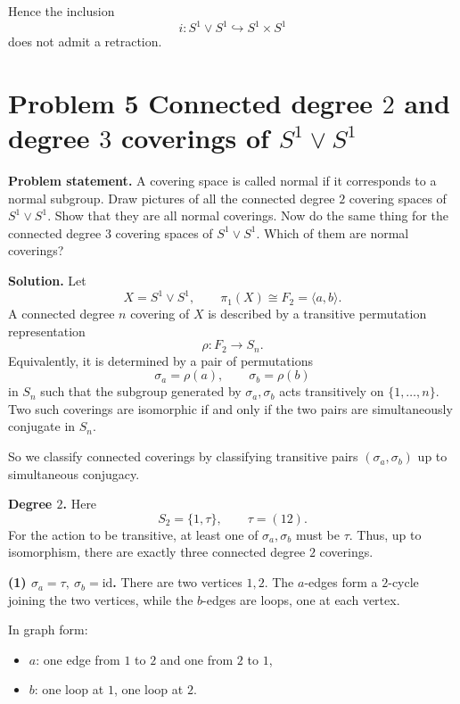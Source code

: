 \documentclass[12pt,a4paper]{article}
\theoremstyle{notespace}
\begin{document}
Hence the inclusion
\[
i:S^1\vee S^1\hookrightarrow S^1\times S^1
\]
does not admit a retraction.

\bigskip

\section{Problem 5 Connected degree \texorpdfstring{$2$}{2} and degree \texorpdfstring{$3$}{3} coverings of \texorpdfstring{$S^1\vee S^1$}{S1 vee S1}}

\textbf{Problem statement.}
A covering space is called normal if it corresponds to a normal subgroup. Draw pictures of all the connected degree \(2\) covering spaces of \(S^1\vee S^1\). Show that they are all normal coverings. Now do the same thing for the connected degree \(3\) covering spaces of \(S^1\vee S^1\). Which of them are normal coverings?

\textbf{Solution.}
Let
\[
X=S^1\vee S^1,
\qquad
\pi_1(X)\cong F_2=\langle a,b\rangle.
\]
A connected degree \(n\) covering of \(X\) is described by a transitive permutation representation
\[
\rho:F_2\to S_n.
\]
Equivalently, it is determined by a pair of permutations
\[
\sigma_a=\rho(a),\qquad \sigma_b=\rho(b)
\]
in \(S_n\) such that the subgroup generated by \(\sigma_a,\sigma_b\) acts transitively on \(\{1,\dots,n\}\). Two such coverings are isomorphic if and only if the two pairs are simultaneously conjugate in \(S_n\).

So we classify connected coverings by classifying transitive pairs \((\sigma_a,\sigma_b)\) up to simultaneous conjugacy.

\medskip

\textbf{Degree \(2\).}
Here
\[
S_2=\{1,\tau\},
\qquad
\tau=(12).
\]
For the action to be transitive, at least one of \(\sigma_a,\sigma_b\) must be \(\tau\). Thus, up to isomorphism, there are exactly three connected degree \(2\) coverings.

\medskip

\textbf{(1) \(\sigma_a=\tau,\ \sigma_b=\mathrm{id}\).}
There are two vertices \(1,2\). The \(a\)-edges form a \(2\)-cycle joining the two vertices, while the \(b\)-edges are loops, one at each vertex.

In graph form:
\begin{itemize}
	\item \(a\): one edge from \(1\) to \(2\) and one from \(2\) to \(1\),
	\item \(b\): one loop at \(1\), one loop at \(2\).
\end{itemize}
\end{document}
